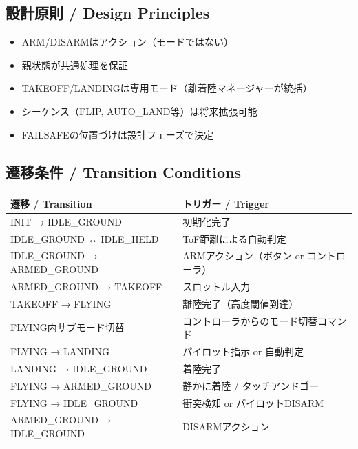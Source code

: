 \documentclass[a4paper,11pt]{article}
\newcommand{\thead}[1]{\textbf{\color{accentdark}#1}}
\begin{document}
\subsection{設計原則 / Design Principles}

\begin{itemize}[leftmargin=*, itemsep=2pt]
    \item ARM/DISARMはアクション（モードではない）
    \item 親状態が共通処理を保証
    \item TAKEOFF/LANDINGは専用モード（離着陸マネージャーが統括）
    \item シーケンス（FLIP, AUTO\_LAND等）は将来拡張可能
    \item FAILSAFEの位置づけは設計フェーズで決定
\end{itemize}

\subsection{遷移条件 / Transition Conditions}

\begin{table}[h]
\centering
\begin{tabular}{@{}ll@{}}
\toprule
\thead{遷移 / Transition} & \thead{トリガー / Trigger} \\
\midrule
INIT → IDLE\_GROUND & 初期化完了 \\
IDLE\_GROUND ↔ IDLE\_HELD & ToF距離による自動判定 \\
IDLE\_GROUND → ARMED\_GROUND & ARMアクション（ボタン or コントローラ） \\
ARMED\_GROUND → TAKEOFF & スロットル入力 \\
TAKEOFF → FLYING & 離陸完了（高度閾値到達） \\
FLYING内サブモード切替 & コントローラからのモード切替コマンド \\
FLYING → LANDING & パイロット指示 or 自動判定 \\
LANDING → IDLE\_GROUND & 着陸完了 \\
FLYING → ARMED\_GROUND & 静かに着陸 / タッチアンドゴー \\
FLYING → IDLE\_GROUND & 衝突検知 or パイロットDISARM \\
ARMED\_GROUND → IDLE\_GROUND & DISARMアクション \\
\bottomrule
\end{tabular}
\end{table}

\end{document}
